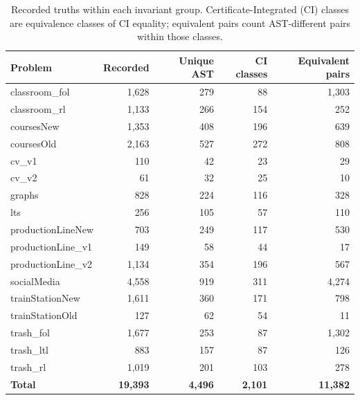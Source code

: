 \begin{table}[H]
\centering
\caption{Recorded truths within each invariant group. Certificate-Integrated (CI)
classes are equivalence classes of CI equality; equivalent pairs
count AST-different pairs within those classes.}
\label{tab:truth_metrics}
\scriptsize
\setlength{\tabcolsep}{3.4pt}
\begin{tabular}{@{}lrrrr@{}}
\toprule
Problem & Recorded & Unique AST & CI classes & Equivalent pairs\\
\midrule
classroom\_fol & 1,628 & 279 & 88 & 1,303\\
classroom\_rl & 1,133 & 266 & 154 & 252\\
coursesNew & 1,353 & 408 & 196 & 639\\
coursesOld & 2,163 & 527 & 272 & 808\\
cv\_v1 & 110 & 42 & 23 & 29\\
cv\_v2 & 61 & 32 & 25 & 10\\
graphs & 828 & 224 & 116 & 328\\
lts & 256 & 105 & 57 & 110\\
productionLineNew & 703 & 249 & 117 & 530\\
productionLine\_v1 & 149 & 58 & 44 & 17\\
productionLine\_v2 & 1,134 & 354 & 196 & 567\\
socialMedia & 4,558 & 919 & 311 & 4,274\\
trainStationNew & 1,611 & 360 & 171 & 798\\
trainStationOld & 127 & 62 & 54 & 11\\
trash\_fol & 1,677 & 253 & 87 & 1,302\\
trash\_ltl & 883 & 157 & 87 & 126\\
trash\_rl & 1,019 & 201 & 103 & 278\\
\midrule
\textbf{Total} & \textbf{19,393} & \textbf{4,496} & \textbf{2,101} & \textbf{11,382}\\
\bottomrule
\end{tabular}
\end{table}
